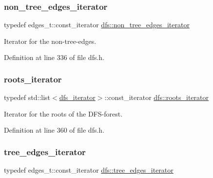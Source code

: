 \subsubsection{\texorpdfstring{non\+\_\+tree\+\_\+edges\+\_\+iterator}{non\_tree\_edges\_iterator}}
{\footnotesize\ttfamily typedef edges\+\_\+t\+::const\+\_\+iterator \mbox{\hyperlink{classdfs_a95e353f354d3b31daded0c4fe749171a}{dfs\+::non\+\_\+tree\+\_\+edges\+\_\+iterator}}\hspace{0.3cm}{\ttfamily [inherited]}}



Iterator for the non-\/tree-\/edges. 



Definition at line 336 of file dfs.\+h.

\mbox{\label{classdfs_a1ea6e8eb2766ac95ac48a8523359065a}} 
\subsubsection{\texorpdfstring{roots\+\_\+iterator}{roots\_iterator}}
{\footnotesize\ttfamily typedef std\+::list$<$\mbox{\hyperlink{classdfs_a15fe023a5a1f7ddda00f3d87110d9a32}{dfs\+\_\+iterator}}$>$\+::const\+\_\+iterator \mbox{\hyperlink{classdfs_a1ea6e8eb2766ac95ac48a8523359065a}{dfs\+::roots\+\_\+iterator}}\hspace{0.3cm}{\ttfamily [inherited]}}



Iterator for the roots of the D\+F\+S-\/forest. 



Definition at line 360 of file dfs.\+h.

\mbox{\label{classdfs_accde8d5403404f6d22fe4756d4ffedd5}} 
\subsubsection{\texorpdfstring{tree\+\_\+edges\+\_\+iterator}{tree\_edges\_iterator}}
{\footnotesize\ttfamily typedef edges\+\_\+t\+::const\+\_\+iterator \mbox{\hyperlink{classdfs_accde8d5403404f6d22fe4756d4ffedd5}{dfs\+::tree\+\_\+edges\+\_\+iterator}}\hspace{0.3cm}{\ttfamily [inherited]}}



